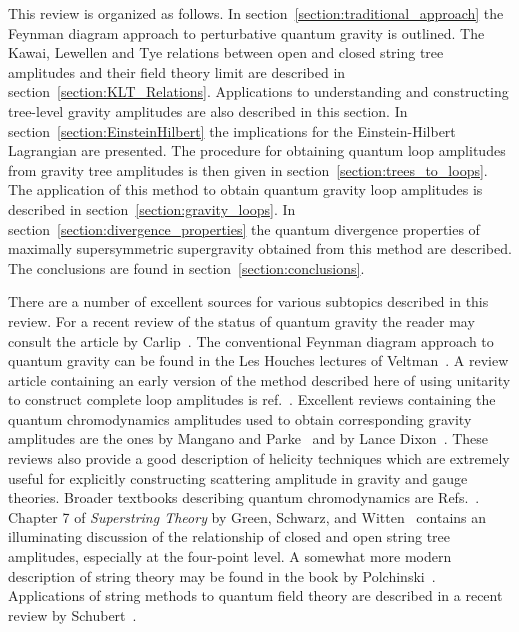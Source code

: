 This review is organized as follows.  In
section~\ref{section:traditional_approach} the Feynman diagram
approach to perturbative quantum gravity is outlined.  The Kawai,
Lewellen and Tye relations between open and closed string tree
amplitudes and their field theory limit are described in
section~\ref{section:KLT_Relations}.  Applications to understanding
and constructing tree-level gravity amplitudes are also described in
this section.  In section~\ref{section:EinsteinHilbert} the
implications for the Einstein-Hilbert Lagrangian are presented. The
procedure for obtaining quantum loop amplitudes from gravity tree
amplitudes is then given in section~\ref{section:trees_to_loops}.  The
application of this method to obtain quantum gravity loop amplitudes
is described in section~\ref{section:gravity_loops}. In
section~\ref{section:divergence_properties} the quantum divergence
properties of maximally supersymmetric supergravity obtained from this
method are described.  The conclusions are found in
section~\ref{section:conclusions}.

There are a number of excellent sources for various subtopics
described in this review.  For a recent review of the status of
quantum gravity the reader may consult the article by
Carlip~\cite{Carlip}. The conventional Feynman diagram approach to
quantum gravity can be found in the Les Houches lectures of
Veltman~\cite{VeltmanGravity}.  A review article containing an early
version of the method described here of using unitarity to construct
complete loop amplitudes is ref.~\cite{Review}.  Excellent reviews
containing the quantum chromodynamics amplitudes used to obtain
corresponding gravity amplitudes are the ones by Mangano and
Parke~\cite{ManganoReview} and by Lance Dixon~\cite{TasiLance}.  These
reviews also provide a good description of helicity techniques which
are extremely useful for explicitly constructing scattering amplitude
in gravity and gauge theories.  Broader textbooks describing quantum
chromodynamics are Refs.~\cite{Peskin95,Weinberg95,Ellis96}.  Chapter
7 of {\it Superstring Theory} by Green, Schwarz, and Witten~\cite{GSW}
contains an illuminating discussion of the relationship of closed and
open string tree amplitudes, especially at the four-point level.  A
somewhat more modern description of string theory may be found in the
book by Polchinski~\cite{Polchinski98A,Polchinski98B}.  Applications
of string methods to quantum field theory are described in a 
recent review by Schubert~\cite{Schubert01}.


\newpage

